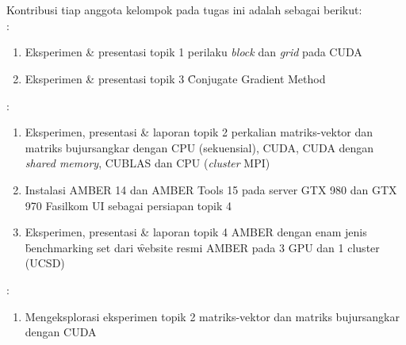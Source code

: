 \chapter{\kontribusi}
Kontribusi tiap anggota kelompok pada tugas ini adalah sebagai berikut: \\[8pt]

:
\begin{enumerate}
	\item Eksperimen \& presentasi topik 1 perilaku \textit{block} dan \textit{grid} pada CUDA
	\item Eksperimen \& presentasi topik 3 \f{Conjugate Gradient Method}
\end{enumerate}

:
\begin{enumerate}	
	\item Eksperimen, presentasi \& laporan topik 2 perkalian matriks-vektor dan matriks bujursangkar dengan CPU (sekuensial), CUDA, CUDA dengan \textit{shared memory}, CUBLAS dan CPU (\textit{cluster} MPI)
	\item Instalasi AMBER 14 dan AMBER Tools 15 pada server GTX 980 dan GTX 970 Fasilkom UI sebagai persiapan topik 4
	\item Eksperimen, presentasi \& laporan topik 4 AMBER dengan enam jenis \f{benchmarking set} dari \f{website} resmi AMBER pada 3 GPU dan 1 cluster (UCSD)
\end{enumerate}

:
\begin{enumerate}
	\item Mengeksplorasi eksperimen topik 2 matriks-vektor dan matriks bujursangkar dengan CUDA
\end{enumerate}
